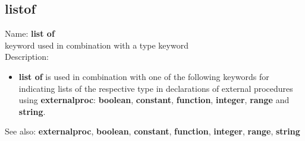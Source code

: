 \subsection{ listof }
\noindent Name: \textbf{list of}\\
keyword used in combination with a type keyword\\

\noindent Description: \begin{itemize}

\item \textbf{list of} is used in combination with one of the following keywords for
   indicating lists of the respective type in declarations of external
   procedures using \textbf{externalproc}: \textbf{boolean}, \textbf{constant}, \textbf{function},
   \textbf{integer}, \textbf{range} and \textbf{string}.
\end{itemize}
See also: \textbf{externalproc}, \textbf{boolean}, \textbf{constant}, \textbf{function}, \textbf{integer}, \textbf{range}, \textbf{string}
